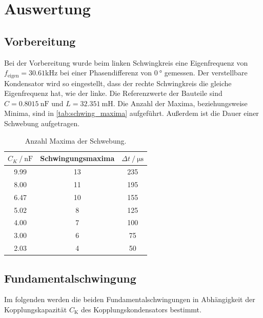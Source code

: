 \section{Auswertung}
\label{sec:Auswertung}

\subsection{Vorbereitung}
Bei der Vorbereitung wurde beim linken Schwingkreis eine Eigenfrequenz von $f_{\text{eigen}}=30.61 \si{\kilo\hertz}$ bei einer
Phasendifferenz von $\SI{0}{\degree}$ gemessen. 
Der verstellbare Kondensator wird so eingestellt, dass der rechte Schwingkreis die gleiche Eigenfrequenz hat, wie der linke.
Die Referenzwerte der Bauteile sind $C=\SI{0.8015}{\nano\farad}$ und $L=\SI{32.351}{\milli\henry}$.
Die Anzahl der Maxima, beziehungsweise Minima, sind in \autoref{tab:schwing_maxima} aufgeführt. Außerdem ist die 
Dauer einer Schwebung aufgetragen.


\begin{table}
  \centering
  \caption{Anzahl Maxima der Schwebung.}
  \label{tab:schwing_maxima}
  \begin{tabular}{c c c}
      \toprule
      {$C_K \:/\: \si{\nano\farad}$} & Schwingungsmaxima & $\Delta t\:/\: \si{\micro\second}$ \\
      \midrule
      9.99  & 13 & 235 \\ 
      8.00  & 11 & 195 \\ 
      6.47  & 10 & 155 \\ 
      5.02 & 8 & 125 \\ 
      4.00 & 7 & 100 \\
      3.00 & 6 & 75 \\
      2.03 & 4 & 50\\ 
      \bottomrule
  \end{tabular}
\end{table}

\subsection{Fundamentalschwingung}
Im folgenden werden die beiden Fundamentalschwingungen in Abhängigkeit der Kopplungskapazität $C_{\text{K}}$ des Kopplungskondensators
bestimmt. 


